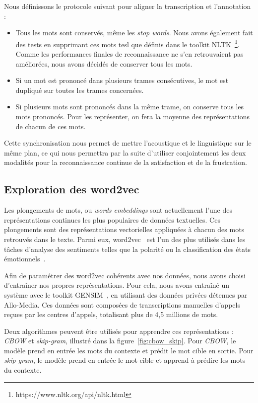 

Nous définissons le protocole suivant pour aligner la transcription et l'annotation :
\begin{itemize}
  \item Tous les mots sont conservés, même les \textit{stop words}. Nous avons également fait des tests en supprimant ces mots tesl que définis dans le toolkit NLTK~\footnote{https://www.nltk.org/api/nltk.html}. Comme les performances finales de reconnaissance ne s'en retrouvaient pas améliorées, nous avons décidés de conserver tous les mots.
  \item Si un mot est prononcé dans plusieurs trames consécutives, le mot est dupliqué sur toutes les trames concernées.
  \item Si plusieurs mots sont prononcés dans la même trame, on conserve tous les mots prononcés. Pour les représenter, on fera la moyenne des représentations de chacun de ces mots.
\end{itemize}

Cette synchronisation nous permet de mettre l'acoustique et le linguistique sur le même plan, ce qui nous permettra par la suite d'utiliser conjointement les deux modalités pour la reconnaissance continue de la satisfaction et de la frustration.

\subsection{Exploration des word2vec}
Les plongements de mots, ou \textit{words embeddings} sont actuellement l'une des représentations continues les plus populaires de données textuelles. Ces plongements sont des représentations vectorielles appliquées à chacun des mots retrouvés dans le texte.
Parmi eux, word2vec~\cite{word2vec} est l'un des plus utilisés dans les tâches d'analyse des sentiments telles que la polarité ou la classification des états émotionnels~\cite{Dong2018}.

Afin de paramétrer des word2vec cohérents avec nos données, nous avons choisi d’entraîner nos propres représentations. Pour cela, nous avons entraîné un système avec le toolkit GENSIM~\cite{gensim}, en utilisant des données privées détenues par Allo-Media. Ces données sont composées de transcriptions manuelles d'appels reçues par les centres d'appels, totalisant plus de 4,5 millions de mots.

Deux algorithmes peuvent être utilisés pour apprendre ces représentations : \textit{CBOW} et \textit{skip-gram}, illustré dans la figure~\ref{fig:cbow_skip}. Pour \textit{CBOW}, le modèle prend en entrée les mots du contexte et prédit le mot cible en sortie. Pour \textit{skip-gram}, le modèle prend en entrée le mot cible et apprend à prédire les mots du contexte.

